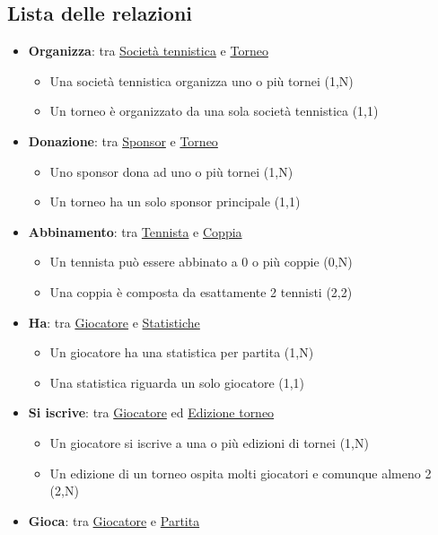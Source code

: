 \documentclass[10pt]{article}
\begin{document}
\subsection{Lista delle relazioni}
\begin{itemize}
    \item \textbf{Organizza}: tra \underline{Società tennistica} e \underline{Torneo}
    \begin{itemize}
        \item Una società tennistica organizza uno o più tornei (1,N)
        \item Un torneo è organizzato da una sola società tennistica (1,1)
    \end{itemize}
    \item \textbf{Donazione}: tra \underline{Sponsor} e \underline{Torneo}
    \begin{itemize}
        \item Uno sponsor dona ad uno o più tornei (1,N)
        \item Un torneo ha un solo sponsor principale (1,1)
    \end{itemize}
    \item \textbf{Abbinamento}: tra \underline{Tennista} e \underline{Coppia}
    \begin{itemize}
        \item Un tennista può essere abbinato a 0 o più coppie (0,N)
        \item Una coppia è composta da esattamente 2 tennisti (2,2)
    \end{itemize}
    \item \textbf{Ha}: tra \underline{Giocatore} e \underline{Statistiche}
    \begin{itemize}
        \item Un giocatore ha una statistica per partita (1,N)
        \item Una statistica riguarda un solo giocatore (1,1)
    \end{itemize}
    \item \textbf{Si iscrive}: tra \underline{Giocatore} ed \underline{Edizione torneo}
    \begin{itemize}
        \item Un giocatore si iscrive a una o più edizioni di tornei (1,N)
        \item Un edizione di un torneo ospita molti giocatori e comunque almeno 2 (2,N)
    \end{itemize}
    \item \textbf{Gioca}: tra \underline{Giocatore} e \underline{Partita}

\end{itemize}
\end{document}
